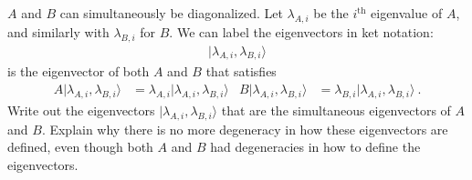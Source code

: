 \documentclass[12pt]{article}
\numberwithin{equation}{section}    %
\begin{document}
$A$ and $B$ can simultaneously be diagonalized. Let $\lambda_{A,i}$ be the $i^\text{th}$ eigenvalue of $A$, and similarly with $\lambda_{B,i}$ for $B$. We can label the eigenvectors in ket notation:
\begin{align}
	|\lambda_{A,i}, \lambda_{B,i} \rangle
\end{align}
is the eigenvector of both $A$ and $B$ that satisfies
\begin{align}
	A|\lambda_{A,i}, \lambda_{B,i} \rangle
	&= \lambda_{A,i}|\lambda_{A,i}, \lambda_{B,i} \rangle
	&
	B|\lambda_{A,i}, \lambda_{B,i} \rangle
	&=
	\lambda_{B,i}
	|\lambda_{A,i}, \lambda_{B,i} \rangle \ .
\end{align}
Write out the eigenvectors $|\lambda_{A,i}, \lambda_{B,i} \rangle$ that are the simultaneous eigenvectors of $A$ and $B$. Explain why there is no more degeneracy in how these eigenvectors are defined, even though both $A$ and $B$ had degeneracies in how to define the eigenvectors. 





\end{document}
